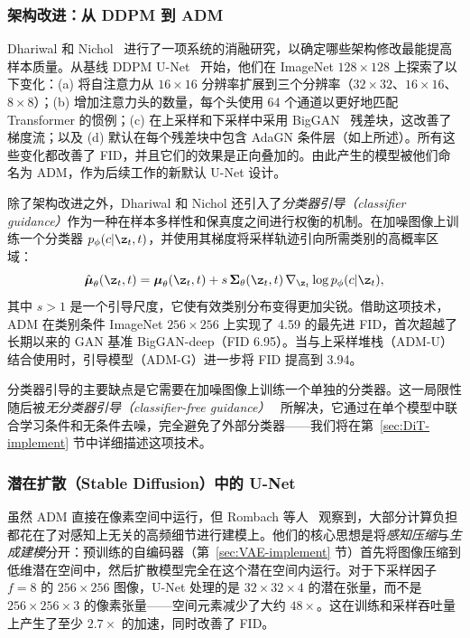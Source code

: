 \documentclass[../../book-main_zh.tex]{subfiles}
\begin{document}
\subsubsection{架构改进：从 DDPM 到 ADM}
\label{sec:unet-adm}

Dhariwal 和 Nichol~\citep{dhariwal2021diffusion} 进行了一项系统的消融研究，以确定哪些架构修改最能提高样本质量。从基线 DDPM U-Net~\citep{ho2020denoising} 开始，他们在 ImageNet $128 \times 128$ 上探索了以下变化：(a) 将自注意力从 $16 \times 16$ 分辨率扩展到三个分辨率（$32 \times 32$、$16 \times 16$、$8 \times 8$）；(b) 增加注意力头的数量，每个头使用 64 个通道以更好地匹配 Transformer 的惯例；(c) 在上采样和下采样中采用 BigGAN~\citep{brock2019large} 残差块，这改善了梯度流；以及 (d) 默认在每个残差块中包含 AdaGN 条件层（如上所述）。所有这些变化都改善了 FID，并且它们的效果是正向叠加的。由此产生的模型被他们命名为 ADM，作为后续工作的新默认 U-Net 设计。

除了架构改进之外，Dhariwal 和 Nichol 还引入了\emph{分类器引导（classifier guidance）}作为一种在样本多样性和保真度之间进行权衡的机制。在加噪图像上训练一个分类器 $p_\phi(c|\z_t, t)$，并使用其梯度将采样轨迹引向所需类别的高概率区域：
\begin{equation}
    \hat{\boldsymbol{\mu}}_\theta(\z_t, t) = \boldsymbol{\mu}_\theta(\z_t, t) + s \, \boldsymbol{\Sigma}_\theta(\z_t, t) \, \nabla_{\z_t} \log p_\phi(c|\z_t),
\end{equation}
其中 $s > 1$ 是一个引导尺度，它使有效类别分布变得更加尖锐。借助这项技术，ADM 在类别条件 ImageNet $256 \times 256$ 上实现了 4.59 的最先进 FID，首次超越了长期以来的 GAN 基准 BigGAN-deep（FID 6.95）。当与上采样堆栈（ADM-U）结合使用时，引导模型（ADM-G）进一步将 FID 提高到 3.94。

分类器引导的主要缺点是它需要在加噪图像上训练一个单独的分类器。这一局限性随后被\emph{无分类器引导（classifier-free guidance）}~\citep{ho2022classifier} 所解决，它通过在单个模型中联合学习条件和无条件去噪，完全避免了外部分类器——我们将在第~\ref{sec:DiT-implement} 节中详细描述这项技术。

\subsubsection{潜在扩散（Stable Diffusion）中的 U-Net}
\label{sec:unet-ldm}

虽然 ADM 直接在像素空间中运行，但 Rombach 等人~\citep{rombach2022high} 观察到，大部分计算负担都花在了对感知上无关的高频细节进行建模上。他们的核心思想是将\emph{感知压缩}与\emph{生成建模}分开：预训练的自编码器（第~\ref{sec:VAE-implement} 节）首先将图像压缩到低维潜在空间中，然后扩散模型完全在这个潜在空间内运行。对于下采样因子 $f = 8$ 的 $256 \times 256$ 图像，U-Net 处理的是 $32 \times 32 \times 4$ 的潜在张量，而不是 $256 \times 256 \times 3$ 的像素张量——空间元素减少了大约 $48\times$。这在训练和采样吞吐量上产生了至少 $2.7\times$ 的加速，同时改善了 FID。
\end{document}
